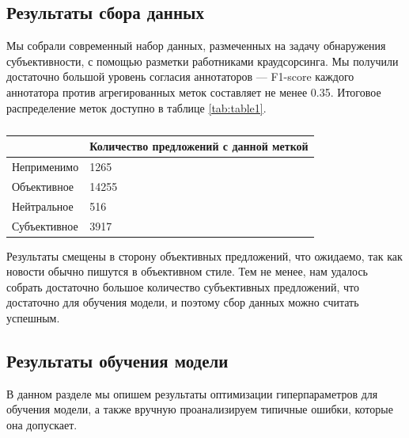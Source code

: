 \documentclass[conference]{IEEEtran}
\begin{document}
\subsection{Результаты сбора данных}
Мы собрали современный набор данных, размеченных на задачу обнаружения субъективности, с помощью разметки работниками краудсорсинга. Мы получили достаточно большой уровень согласия аннотаторов --- F1-score каждого аннотатора против агрегированных меток составляет не менее 0.35. Итоговое распределение меток доступно в таблице \ref{tab:table1}.
\begin{table}[h!]
    \begin{center}
        \begin{tabular}{|l|l|}
            \hline
            & Количество предложений с данной меткой \\ \hline
            Неприменимо & 1265 \\ \hline
            Объективное & 14255 \\ \hline
            Нейтральное & 516 \\ \hline
            Субъективное & 3917 \\ \hline
        \end{tabular}
        \caption{}
        \label{tab:label-distribution}    
    \end{center}
\end{table}

Результаты смещены в сторону объективных предложений, что ожидаемо, так как новости обычно пишутся в объективном стиле. Тем не менее, нам удалось собрать достаточно большое количество субъективных предложений, что достаточно для обучения модели, и поэтому сбор данных можно считать успешным.

\subsection{Результаты обучения модели}
В данном разделе мы опишем результаты оптимизации гиперпараметров для обучения модели, а также вручную проанализируем типичные ошибки, которые она допускает.
\end{document}
